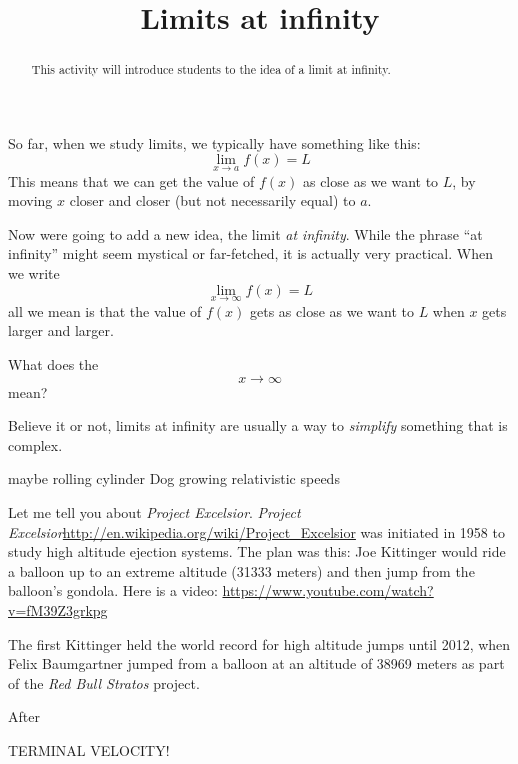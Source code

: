 \documentclass{ximera}
\title{Limits at infinity}
\begin{document}
\begin{abstract}
  This activity will introduce students to the idea of a limit at infinity.
\end{abstract}
\maketitle

So far, when we study limits, we typically have something like this:
\[
\lim_{x\to a} f(x) = L
\]
This means that we can get the value of $f(x)$ as close as we want to
$L$, by moving $x$ closer and closer (but not necessarily equal) to $a$. 

Now were going to add a new idea, the limit \textit{at
  infinity}. While the phrase ``at infinity'' might seem mystical or
far-fetched, it is actually very practical. When we write
\[
\lim_{x\to \infty} f(x) = L
\]
all we mean is that the value of $f(x)$ gets as close as we want to
$L$ when $x$ gets larger and larger. 

\begin{question}
What does the 
\[
x\to \infty
\]
mean?
\begin{solution}
\begin{multiple-choice}
\end{multiple-choice}
\end{solution}
\end{question}


Believe it or not, limits at infinity are usually a way to
\textit{simplify} something that is complex.

maybe rolling cylinder
Dog growing
relativistic speeds


Let me tell you about \textit{Project Excelsior}. \textit{Project
  Excelsior}\url{http://en.wikipedia.org/wiki/Project_Excelsior} was
initiated in 1958 to study high altitude ejection systems. The plan
was this: Joe Kittinger would ride a balloon up to an extreme altitude
(31333 meters) and then jump from the balloon's gondola. Here is a
video: \url{https://www.youtube.com/watch?v=fM39Z3grkpg}


The first 
Kittinger held the world record for high altitude jumps until 2012,
when Felix Baumgartner jumped from a balloon at an altitude of 38969
meters as part of the \textit{Red Bull Stratos} project.

After 


TERMINAL VELOCITY!
\end{document}
